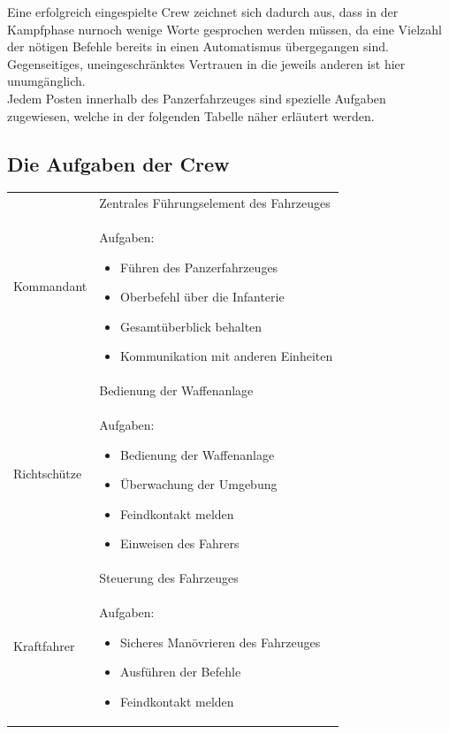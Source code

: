 	Eine erfolgreich eingespielte Crew zeichnet sich dadurch aus, dass in der Kampfphase nurnoch wenige Worte gesprochen werden müssen, da eine Vielzahl der nötigen Befehle bereits in einen Automatismus übergegangen sind. Gegenseitiges, uneingeschränktes Vertrauen in die jeweils anderen ist hier unumgänglich.\\

	Jedem Posten innerhalb des Panzerfahrzeuges sind spezielle Aufgaben zugewiesen, welche in der folgenden Tabelle näher erläutert werden.

\subsection{Die Aufgaben der Crew}
	\begin{longtable}{lp{}} 
		\toprule
		\multirow{2}{*}{Kommandant} & Zentrales Führungselement des Fahrzeuges\\
		& \begin{minipage}[t]{0.4\textwidth}
			Aufgaben:
			\begin{itemize}
				\item Führen des Panzerfahrzeuges
				\item Oberbefehl über die Infanterie
				\item Gesamtüberblick behalten
				\item Kommunikation mit anderen Einheiten
			\end{itemize}
		\end{minipage}\\
		\midrule
		\multirow{2}{*}{Richtschütze} & Bedienung der Waffenanlage\\
		& \begin{minipage}[t]{0.4\textwidth}
			Aufgaben:
			\begin{itemize}
				\item Bedienung der Waffenanlage
				\item Überwachung der Umgebung
				\item Feindkontakt melden
				\item Einweisen des Fahrers
			\end{itemize}
		\end{minipage}\\	
		\midrule
		\multirow{2}{*}{Kraftfahrer} & Steuerung des Fahrzeuges\\
		& \begin{minipage}[t]{0.4\textwidth}
			Aufgaben:
			\begin{itemize}
				\item Sicheres Manövrieren des Fahrzeuges
				\item Ausführen der Befehle
				\item Feindkontakt melden
			\end{itemize}
		\end{minipage}\\		
		\bottomrule 
	\end{longtable}
	
